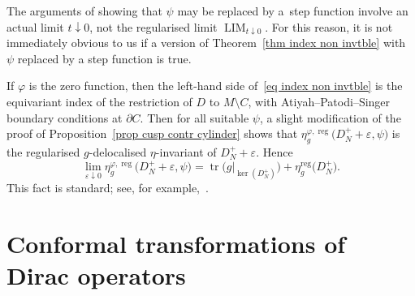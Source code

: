 \documentclass[pdftex]{sigma}%
\numberwithin{equation}{section}
\DeclareMathOperator{\tr}{tr}
\DeclareMathOperator{\reg}{reg}
\DeclareMathOperator{\LIM}{LIM}
\begin{document}
\begin{Remark}The arguments of \cite[Section~4.5]{HW21a} showing that $\psi$ may be replaced by a~step function involve an actual limit $t\downarrow 0$, not the regularised limit $\LIM_{t\downarrow 0}$. For this reason, it is not immediately obvious to us if a version of Theorem~\ref{thm index non invtble} with $\psi$ replaced by a step function is true.
\end{Remark}

\begin{Example}%
If $\varphi$ is the zero function, then the left-hand side of~\eqref{eq index non invtble} is the equivariant index of the restriction of $D$ to $M \setminus C$, with Atiyah--Patodi--Singer boundary conditions at $\partial C$. Then for all suitable $\psi$,
a slight modification of the proof of Proposition~\ref{prop cusp contr cylinder} shows that $\eta^{\varphi, \reg}_g\big(D_N^+ +\varepsilon, \psi\big)$ is the regularised $g$-delocalised $\eta$-invariant of $D_N^++\varepsilon$.
Hence
\[
\lim_{\varepsilon \downarrow 0}\eta^{\varphi, \reg}_g\big(D_N^+ +\varepsilon, \psi\big) = \tr\big(g|_{\ker(D_N^+)}\big) + \eta_g^{\reg}\big(D_N^+\big).
\]
This fact is standard; see, for example,~\cite[Lemma~6.7]{HWW}.
\end{Example}

\appendix

\section{Conformal transformations of Dirac operators}\label{app Dirac}
\end{document}
